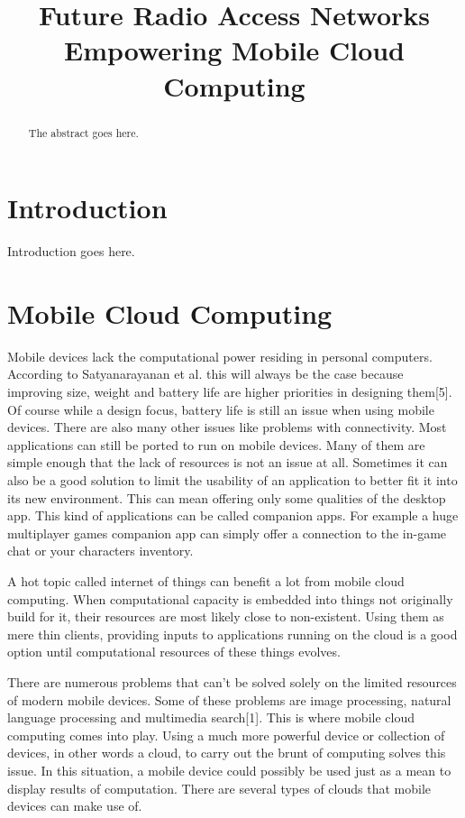 \documentclass[conference]{IEEEtran}
\begin{document}
\title{Future Radio Access Networks Empowering Mobile Cloud Computing}

\author{
}

\maketitle

\begin{abstract}
The abstract goes here.
\end{abstract}

\section{Introduction}
Introduction goes here.

\section{Mobile Cloud Computing}
Mobile devices lack the computational power residing in personal computers. According to Satyanarayanan et al. this will always be the case because improving size, weight and battery life are higher priorities in designing them[5]. Of course while a design focus, battery life is still an issue when using mobile devices. There are also many other issues like problems with connectivity. Most applications can still be ported to run on mobile devices. Many of them are simple enough that the lack of resources is not an issue at all. Sometimes it can also be a good solution to limit the usability of an application to better fit it into its new environment. This can mean offering only some qualities of the desktop app. This kind of applications can be called companion apps. For example a huge multiplayer games companion app can simply offer a connection to the in-game chat or your characters inventory.
\par
A hot topic called internet of things can benefit a lot from mobile cloud computing. When computational capacity is embedded into things not originally build for it, their resources are most likely close to non-existent. Using them as mere thin clients, providing inputs to applications running on the cloud is a good option until computational resources of these things evolves.
\par
There are numerous problems that can't be solved solely on the limited resources of modern mobile devices. Some of these problems are image processing, natural language processing and multimedia search[1]. This is where mobile cloud computing comes into play. Using a much more powerful device or collection of devices, in other words a cloud, to carry out the brunt of computing solves this issue. In this situation, a mobile device could possibly be used just as a mean to display results of computation. There are several types of clouds that mobile devices can make use of.\\
\end{document}
